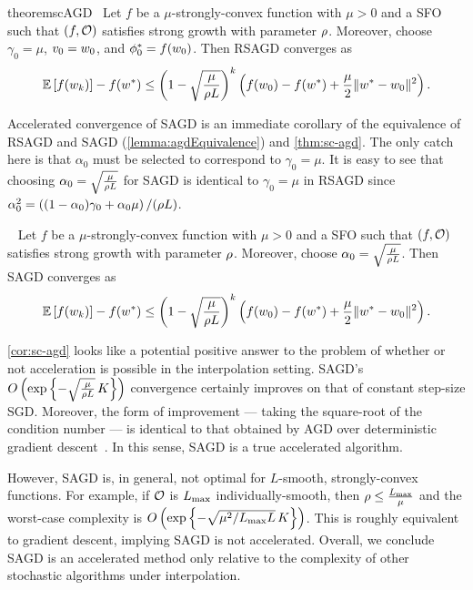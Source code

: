 \begin{restatable}{theorem}{scAGD}~\label{thm:sc-agd}
    Let \( f \) be a \( \mu \)-strongly-convex function with \( \mu > 0 \) and \oracle{} a \ac{SFO} such that \( \rbr{f, \oracle{}} \) satisfies strong growth with parameter \( \sgc \).
    Moreover, choose \( \gamma_0 = \mu \), \( v_0 = \w_0 \), and \( \phi_0^* = f(\w_0) \).
    Then \ac{RSAGD} converges as  
    \[ \E\sbr{f(\wk)} - f(\wopt) \leq \rbr{1 - \sqrt{\frac{\mu}{\sgc L}}}^{k} \rbr{ f(w_0) - f(\wopt) + \frac{\mu}{2} \norm{\wopt - \w_0}^2 }.  \]
\end{restatable}

Accelerated convergence of \ac{SAGD} is an immediate corollary of the equivalence of \ac{RSAGD} and \ac{SAGD} (\autoref{lemma:agdEquivalence}) and \autoref{thm:sc-agd}.
The only catch here is that \( \alpha_0 \) must be selected to correspond to \( \gamma_0 = \mu \).
It is easy to see that choosing \( \alpha_0 = \sqrt{\frac{\mu}{\sgc L}} \) for \ac{SAGD} is identical to \( \gamma_0 = \mu \) in \ac{RSAGD} since \( \alpha_0^2 = \rbr{(1 - \alpha_0)\gamma_0 + \alpha_0 \mu} / (\sgc L) \).

\begin{corollary}~\label{cor:sc-agd}
    Let \( f \) be a \( \mu \)-strongly-convex function with \( \mu > 0 \) and \oracle{} a \ac{SFO} such that \( \rbr{f, \oracle{}} \) satisfies strong growth with parameter \( \sgc \).
    Moreover, choose \( \alpha_0 = \sqrt{\frac{\mu}{\sgc L}} \). 
    Then \ac{SAGD} converges as  
    \[ \E\sbr{f(\wk)} - f(\wopt) \leq \rbr{1 - \sqrt{\frac{\mu}{\sgc L}}}^{k} \rbr{ f(w_0) - f(\wopt) + \frac{\mu}{2} \norm{\wopt - \w_0}^2 }.  \]
\end{corollary}

\autoref{cor:sc-agd} looks like a potential positive answer to the problem of whether or not acceleration is possible in the interpolation setting.
\ac{SAGD}'s \( O\rbr{ \exp \cbr{- \sqrt{\frac{\mu}{\sgc L}} \, K}} \) convergence certainly improves on that of constant step-size \ac{SGD}.
Moreover, the form of improvement --- taking the square-root of the condition number --- is identical to that obtained by \ac{AGD} over deterministic gradient descent~\citep{nesterov2004lectures}.
In this sense, \ac{SAGD} is a true accelerated algorithm.

However, \ac{SAGD} is, in general, not optimal for \( L \)-smooth, strongly-convex functions. 
For example, if \( \oracle{} \) is \( \Lmax \) individually-smooth, then \( \sgc \leq \frac{\Lmax}{\mu} \) and the worst-case complexity is \( O\rbr{ \exp \cbr{- \sqrt{\mu^2 / \Lmax L} \, K}}\).
This is roughly equivalent to gradient descent, implying \ac{SAGD} is not accelerated. 
Overall, we conclude \ac{SAGD} is an accelerated method only relative to the complexity of other stochastic algorithms under interpolation.

